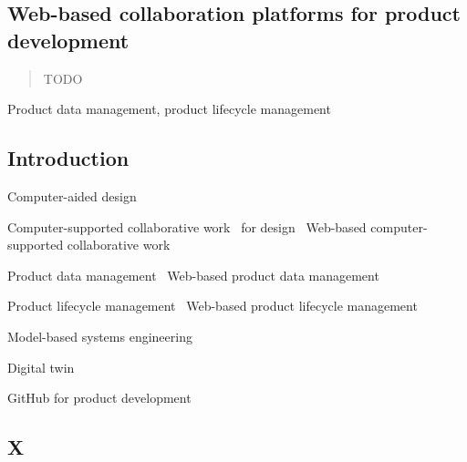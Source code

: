 \documentclass[numbers,sort&compress]{IntechOpen-Book}%
\begin{document}
\Mainmatter

\begin{frontmatter}

\chapter{Web-based collaboration platforms for product development}
\author{Georg Hackenberg}
\author{Christian Zehetner}

\makechaptertitle


\begin{abstract} %
TODO
\end{abstract}

\begin{keywords} %
Product data management, product lifecycle management
\end{keywords}


\end{frontmatter}

\section{Introduction} %

Computer-aided design~\cite{Ross_1963}

Computer-supported collaborative work~\cite{Kraemer_1988} for design~\cite{Bokder_1988}
Web-based computer-supported collaborative work~\cite{Bentley_1997}

Product data management~\cite{Philpotts_1996}
Web-based product data management~\cite{TonyLui_2001}

Product lifecycle management~\cite{Grieves_2005}
Web-based product lifecycle management~\cite{Vezzetti_2009}

Model-based systems engineering~\cite{Ogren_2000}

Digital twin~\cite{Grieves_2017}

GitHub for product development~\cite{Hackenberg_2023}

\section{X}
\end{document}
